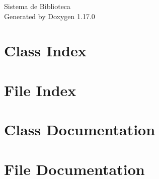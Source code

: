 \documentclass[twoside]{book}
\newcommand{\+}{\discretionary{\mbox{\scriptsize$\hookleftarrow$}}{}{}}
\newcommand{\clearemptydoublepage}{%
    \newpage{\pagestyle{empty}\cleardoublepage}%
  }
\begin{document}
  \raggedbottom
    \hypersetup{pageanchor=false,
                bookmarksnumbered=true,
                pdfencoding=unicode
               }
  \begin{titlepage}
  \vspace*{7cm}
  \begin{center}%
  {\Large Sistema de Biblioteca}\\
  \vspace*{1cm}
  {\large Generated by Doxygen 1.17.0}\\
  \end{center}
  \end{titlepage}
  \clearemptydoublepage
  \tableofcontents
  \clearemptydoublepage
  \hypersetup{pageanchor=true}

\chapter{Class Index}

\chapter{File Index}

\chapter{Class Documentation}


\chapter{File Documentation}


  \backmatter
  \newpage
  \clearemptydoublepage
  \printindex
\end{document}
